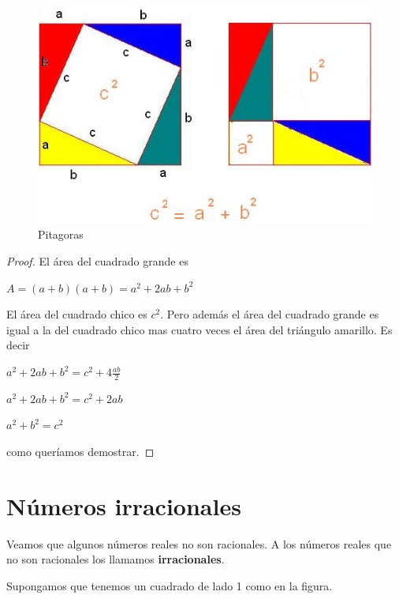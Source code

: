 \begin{figure}[h]
\centering\includegraphics[scale=1]{images/01_precalculo/Pythagore.jpg}
\caption{Pitagoras}
\end{figure}

\begin{proof}
El área del cuadrado grande es 

$A = (a+b)(a+b) = a^2 + 2ab + b^2$

El área del cuadrado chico es $c^2$.  Pero además el área del cuadrado grande es igual a la del cuadrado chico mas cuatro veces el área del triángulo amarillo.  Es decir

$ a^2 + 2ab + b^2 = c^2 + 4 \frac{ab}{2} $

$ a^2 + 2ab + b^2 = c^2 + 2 ab $

$ a^2 + b^2 = c^2 $

como queríamos demostrar.
\end{proof}



\section{Números irracionales} 

Veamos que algunos números reales no son racionales.  A los números reales que no son racionales los llamamos \textbf{irracionales}.

Supongamos que tenemos un cuadrado de lado 1 como en la figura.

